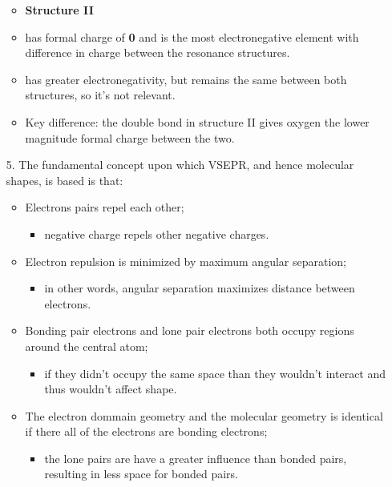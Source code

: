 \documentclass[12pt,a4paper]{article}
\begin{document}
\begin{itemize}
        \begin{itemize}
            \item \textbf{Structure II}
            \item {} has formal charge of \textbf{0} and is the 
            {\color{neg}most electronegative} element with difference in charge between the resonance structures.
            \item {} has greater electronegativity, but remains the same between both structures, so it's not relevant.
            \item Key difference: the double bond in structure II gives oxygen the {\color{o-Sun}lower magnitude} formal charge between the two.
        \end{itemize}
    \item[5.] The fundamental concept upon which VSEPR, and hence molecular shapes, is based is that:
        \begin{itemize}
            \item Electrons pairs repel each other;
                \begin{itemize}
                    \item negative charge repels other negative charges.
                \end{itemize}
            \item Electron repulsion is minimized by maximum angular separation; 
                \begin{itemize}
                    \item in other words, angular separation maximizes distance between electrons.
                \end{itemize}
            \item Bonding pair electrons and lone pair electrons both occupy regions around the central atom;
                \begin{itemize}
                    \item if they didn't occupy the same space than they wouldn't interact and thus wouldn't affect shape.
                \end{itemize}
            \item The electron dommain geometry and the molecular geometry is identical if there all of the electrons are bonding electrons;
                \begin{itemize}
                    \item the lone pairs are have a greater influence than bonded pairs, resulting in less space for bonded pairs.

\end{itemize}
\end{itemize}
\end{itemize}
\end{document}
